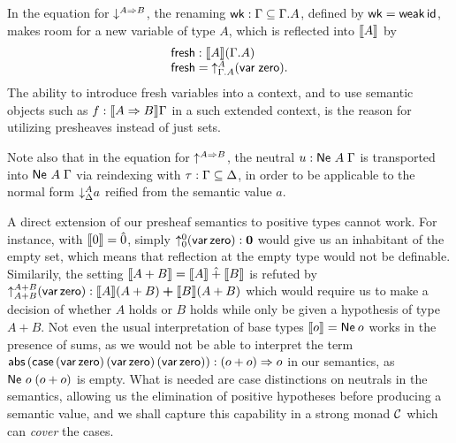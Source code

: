 \documentclass[a4paper,USenglish,cleveref, autoref]{lipics-v2019}
\begin{document}
In the equation for $\down{A \To B}$,
the renaming $\twk : \Gamma \sublist \cext \Gamma A$,
defined by $\twk = \tweak\,\tid$, makes room
for a new variable of type $A$, which is reflected into $\den A$ by
\[
\begin{array}{lcl@{\qquad}lcl}
  \tfresh : \den A (\cext \Gamma A) \\
  \tfresh = \up[\cext \Gamma A] A (\tvar\;\tzero)
  . \\
\end{array}
\]
The ability to introduce fresh variables into a context, and to use
semantic objects such as $f : \den{A \To B}\Gamma$ in a such extended
context, is the reason for utilizing presheaves instead of just sets.

Note also that in the equation for $\up{A \To B}$,
the neutral $u : \Ne A \Gamma$ is
transported into $\Ne A \Gamma$ via reindexing with
$\tau : \Gamma \sublist \Delta$, in order to be applicable to the normal form
$\down[\Delta]A a$
reified from the semantic value $a$.

A direct extension of our presheaf semantics to positive types cannot
work.  For instance, with $\den \tyzero = \hat0$, simply
$\up[\tyzero] \tyzero (\tvar\,\tzero) : \bzero$ would give us an
inhabitant of the empty set, which means that reflection at the empty
type would not be definable.  Similarily, the setting
$\den{A + B} = \den A \hatplus \den B$ is refuted by
$\up[A + B]{A + B} (\tvar\,\tzero) : \den A (A+B) \bplus \den B (A+B)$
which would require us to make a decision of whether $A$ holds or $B$ holds
while only be given a hypothesis of type $A + B$.
Not even the usual interpretation of base types $\den o = \tNe\,o$
works in the presence of sums, as we would not be able to interpret
the term
$\tabs\,(\tcase\,(\tvar\,\tzero)\,(\tvar\,\tzero)\,(\tvar\,\tzero)) :
(o+o) \To o$ in our semantics, as $\Ne o (o+o)$ is empty.
What is needed are case distinctions on neutrals in the semantics,
allowing us the elimination of positive hypotheses before producing a
semantic value,
and we shall capture this capability in a strong monad $\C$
which can \emph{cover} the cases.
\end{document}
